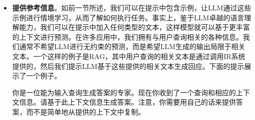 \begin{itemize}
\begin{tcolorbox}
    数学家凭借其渊博的知识，选择针对特定类型数学问题（无论是代数、微积分还是几何）的最有效策略。

    \vspace{0.5em}

    第3步：详细计算。

    数学家以精准和专业的方式，逐步执行必要的计算，并遵守所有数学原则。

    \vspace{0.5em}

    第4步：解答回顾。

    在提供最终答案之前，数学家会仔细检查计算的准确性，并为解答提供简洁的解释或理由。

    \vspace{0.5em}

    你将收到一个数学问题。请解决这个问题。

    \vspace{0.5em}

    $\{*\mathrm{problem}*\}$

    \vspace{0.5em}

    \underline{\hspace{2em}}

    \endgroup

    \end{tcolorbox}
    \vspace{0.5em}

    另一种方法是通过多轮交互，先让模型给出初步答案，再提示其评估、修正，从而引出更可靠的最终结果。

\item \vspace{0.3em} \textbf{提供参考信息}。如前一节所述，我们可以在提示中包含示例，让LLM通过这些示例进行情境学习，从而了解如何执行任务。事实上，鉴于LLM卓越的语言理解能力，我们可以在提示中加入任何类型的文本，这样模型就可以基于更丰富的上下文进行预测。在许多应用中，我们拥有与用户查询相关的各种信息。我们通常不希望LLM进行无约束的预测，而是希望LLM生成的输出局限于相关文本。一个这样的例子是RAG，其中用户查询的相关文本是通过调用IR系统提供的，然后我们提示LLM基于这些提供的相关文本生成回应。下面的提示展示了一个例子。

    \vspace{0.5em}
    \begin{tcolorbox}

    \begingroup
    \setlength{\leftskip}{2em}
    \setlength{\rightskip}{2em}

    你是一位能为输入查询生成答案的专家。现在你收到了一个查询和相应的上下文信息。请基于此上下文信息生成答案。注意，你需要用自己的话来提供答案，而不是简单地从提供的上下文中复制。


\end{tcolorbox}
\end{itemize}
